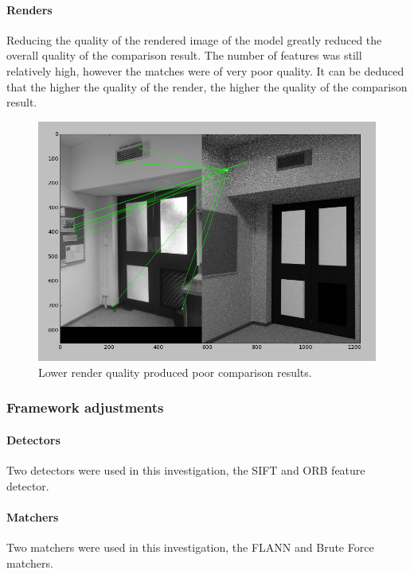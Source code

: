 \documentclass[11pt,a4paper]{report}
\begin{document}
				\paragraph{Renders}
					Reducing the quality of the rendered image of the model greatly reduced the overall quality of the comparison result. The number of features was still relatively high, however the matches were of very poor quality. It can be deduced that the higher the quality of the render, the higher the quality of the comparison result.
					\begin{figure}[H]
						\centering
						\includegraphics[width=1\textwidth]{low_quality_results}
						\caption[Render quality results]{Lower render quality produced poor comparison results.}
						\label{fig:low_quality_results}
					\end{figure}
				
			\subsubsection{Framework adjustments}
				\paragraph{Detectors}
					Two detectors were used in this investigation, the SIFT and ORB feature detector.
				\paragraph{Matchers}
					Two matchers were used in this investigation, the FLANN and Brute Force matchers.
\end{document}
